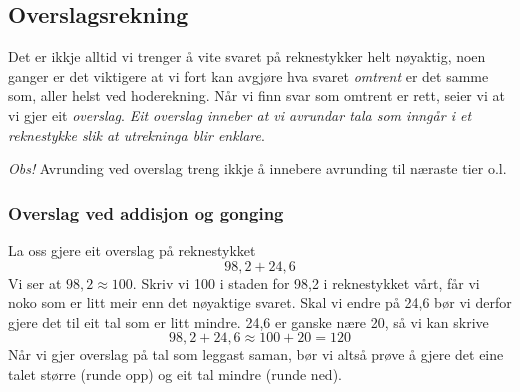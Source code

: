 
\subsection{Overslagsrekning}
Det er ikkje alltid vi trenger å vite svaret på reknestykker helt nøyaktig, noen ganger er det viktigere at vi fort kan avgjøre hva svaret \textsl{omtrent} er det samme som, aller helst ved hoderekning. Når vi finn svar som omtrent er rett, seier vi at vi gjer eit \textit{overslag}. \textsl{Eit overslag inneber at vi avrundar tala som inngår i et reknestykke slik at utrekninga blir enklare}. \vsk

\textit{Obs!} Avrunding ved overslag treng ikkje å innebere avrunding til næraste tier o.l.\vsk


\subsubsection{Overslag ved addisjon og gonging}
La oss gjere  eit overslag på reknestykket
\[ 98,2+24,6 \]
Vi ser at $ 98,2\approx 100 $. Skriv vi 100 i staden for 98,2 i reknestykket vårt, får vi noko som er litt meir enn det nøyaktige svaret. Skal vi endre på 24,6 bør vi derfor gjere det til eit tal som er litt mindre. 24,6 er ganske nære 20, så vi kan skrive 
\[ 98,2+24,6 \approx 100 + 20 = 120 \]
Når vi gjer overslag på tal som leggast saman, bør vi altså prøve å gjere det eine talet større (runde opp) og  eit  tal mindre (runde ned).\\

